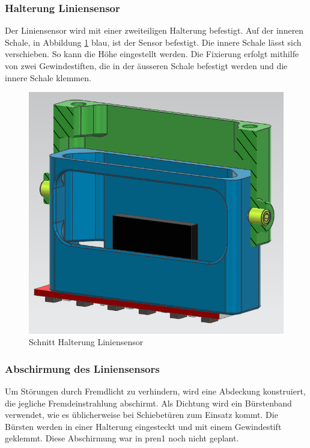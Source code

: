 \newpage

\subsubsection{Halterung Liniensensor}
\label{Halterung Liniensensor}

Der Liniensensor wird mit einer zweiteiligen Halterung befestigt. Auf der inneren Schale, in Abbildung \ref{fig:Schnitt Halterung Liniensensor} blau, ist der Sensor befestigt. Die innere Schale lässt sich verschieben. So kann die Höhe eingestellt werden. Die Fixierung erfolgt mithilfe von zwei Gewindestiften, die in der äusseren Schale befestigt werden und die innere Schale klemmen. 


\begin{figure}[H]
    \centering
    \includegraphics[width=0.75\linewidth]{assets//MT/Sensor Halterung.png}
    \caption{Schnitt Halterung Liniensensor}
    \label{fig:Schnitt Halterung Liniensensor}
\end{figure}


\subsubsection{Abschirmung des Liniensensors}
\label{Abschirmung des Liniensensors}

Um Störungen durch Fremdlicht zu verhindern, wird eine Abdeckung konstruiert, die jegliche Fremdeinstrahlung abschirmt. Als Dichtung wird ein Bürstenband verwendet, wie es üblicherweise bei Schiebetüren zum Einsatz kommt. Die Bürsten werden in einer Halterung eingesteckt und mit einem Gewindestift geklemmt.  Diese Abschirmung war in \acrshort{pren1} noch nicht geplant.


